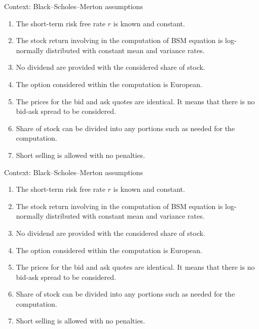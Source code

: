 \documentclass{beamer}
\newcommand{\BSM}{Black--Scholes--Merton }
\begin{document}
\begin{frame}{Context: \BSM assumptions}
  
  \begin{enumerate}
    \item The short-term risk free rate $r$ is known and constant.
    \item The stock return involving in the computation of BSM equation is log-normally distributed with constant mean and variance rates.
    \item No dividend are provided with the considered share of stock.
    \item The option considered within the computation is European.
    \item The prices for the bid and ask quotes are identical. It means that there is no bid-ask spread to be considered.
    \item Share of stock can be divided into any portions such as needed for the computation.
    \item Short selling is allowed with no penalties.
  \end{enumerate} 
\end{frame}

\begin{frame}{Context: \BSM assumptions}
  
  \begin{enumerate}
    \item The short-term risk free rate $r$ is known and constant.
    \item \textcolor{myred}{The stock return involving in the computation of BSM equation is log-normally distributed with constant mean and variance rates.}
    \item No dividend are provided with the considered share of stock.
    \item The option considered within the computation is European.
    \item The prices for the bid and ask quotes are identical. It means that there is no bid-ask spread to be considered.
    \item Share of stock can be divided into any portions such as needed for the computation.
    \item Short selling is allowed with no penalties.
  \end{enumerate} 
\end{frame}
\end{document}
